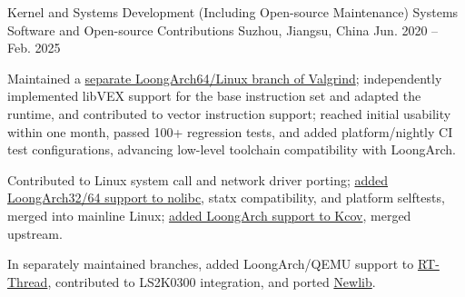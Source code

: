 \begin{cventries}
\cventry
  {Kernel and Systems Development (Including Open-source Maintenance)} %
  {Systems Software and Open-source Contributions} %
  {Suzhou, Jiangsu, China} %
  {Jun. 2020 -- Feb. 2025} %
  {
    \begin{cvitems}
      \item {Maintained a \href{https://github.com/FreeFlyingSheep/valgrind-loongarch64}{separate LoongArch64/Linux branch of Valgrind}; independently implemented libVEX support for the base instruction set and adapted the runtime, and contributed to vector instruction support; reached initial usability within one month, passed 100+ regression tests, and added platform/nightly CI test configurations, advancing low-level toolchain compatibility with LoongArch.}
      \item {Contributed to Linux system call and network driver porting; \href{https://github.com/FreeFlyingSheep/linux/commit/73f12c6da77a7c25cf0a8f1a3c282db2a1e2bd93}{added LoongArch32/64 support to nolibc}, statx compatibility, and platform selftests, merged into mainline Linux; \href{https://github.com/FreeFlyingSheep/kcov/commit/02bc582371c5ff5f4b4781975c2c12f9744b4162}{added LoongArch support to Kcov}, merged upstream.}
      \item {In separately maintained branches, added LoongArch/QEMU support to \href{https://github.com/FreeFlyingSheep/rt-thread}{RT-Thread}, contributed to LS2K0300 integration, and ported \href{https://github.com/FreeFlyingSheep/newlib}{Newlib}.}
    \end{cvitems}
  }
\end{cventries}
